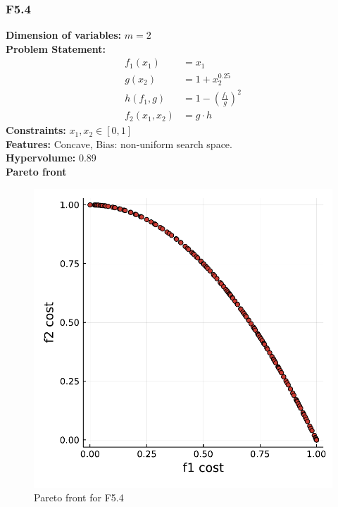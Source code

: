 \documentclass[11pt,oneside,onecolumn,openright]{article}
\begin{document}
   \subsubsection{F5.4~\cite{audet2008multiobjective}}
     \textbf{Dimension of variables: }$m=2$\\
  \noindent\textbf{Problem Statement: }
   \begin{equation}
  \begin{aligned}
  f_1(x_1) &= x_1 \\
  g\left(x_{2}\right)&=1+x_{2}^{0.25}\\
  h\left(f_{1}, g\right)&=1-\left(\frac{f_{1}}{g}\right)^{2}\\
  f_2(x_{1}, x_{2})&=g\cdot h
  \end{aligned}
  \end{equation}
  \noindent\textbf{Constraints: } $x_{1}, x_{2} \in[0,1]$\\
  \noindent\textbf{Features: } Concave, Bias: non-uniform search space. \\
  \noindent\textbf{Hypervolume: } 0.89\\
  \noindent\textbf{Pareto front}
      \begin{figure}[H]
      \centering
      \includegraphics[width=12cm]{fig/bias.pdf}
      \cprotect\caption{Pareto front for F5.4}
      \end{figure}
\end{document}

